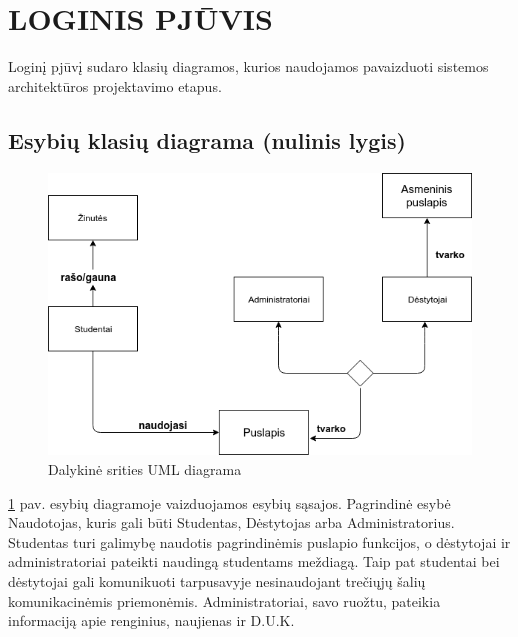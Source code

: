 \documentclass{VUMIFPSkursinis}
\begin{document}
\section{LOGINIS PJŪVIS}
Loginį pjūvį sudaro klasių diagramos, kurios naudojamos pavaizduoti sistemos architektūros projektavimo etapus.
\subsection{Esybių klasių diagrama (nulinis lygis)}
\begin{figure}[H]
\centering
\includegraphics[width=\linewidth]{img/dalykine.png}
\caption{Dalykinė srities UML diagrama}
\label{fig:dalykine}
\end{figure}
\ref{fig:dalykine} pav. esybių diagramoje vaizduojamos esybių sąsajos. Pagrindinė esybė Naudotojas,
kuris gali būti Studentas, Dėstytojas arba Administratorius. Studentas turi galimybę naudotis pagrindinėmis puslapio funkcijos, o dėstytojai ir administratoriai pateikti naudingą studentams meždiagą. Taip pat studentai bei dėstytojai gali komunikuoti tarpusavyje nesinaudojant trečiųjų šalių komunikacinėmis priemonėmis. Administratoriai, savo ruožtu, pateikia informaciją apie renginius, naujienas ir D.U.K.
\end{document}
